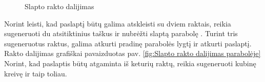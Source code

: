 \documentclass{VUMIFInfBakalaurinis}
\begin{document}
\begin{figure}[ht]%
 \centering
 \caption{Slapto rakto dalijimas}%
 \label{fig:Slapto rakto dalijimas}%
\end{figure}

\par Norint leisti, kad paslaptį būtų galima atskleisti su dviem raktais, reikia sugeneruoti du atsitiktinius taškus ir nubrėžti slaptą parabolę \cite{23}. Turint tris sugeneruotus raktus, galima atkurti pradinę parabolės lygtį ir atkurti paslaptį. Rakto dalijimas grafiškai pavaizduotas pav. \ref{fig:Slapto rakto dalijimas parabolėje} Norint, kad paslaptis būtų atgaminta iš keturių raktų, reikia sugeneruoti kubinę kreivę ir taip toliau. %
\end{document}

